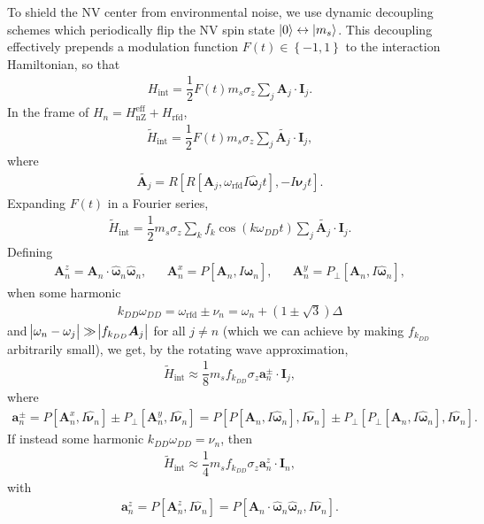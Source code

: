 \documentclass[11pt]{article}
\renewcommand{\t}{\text} %
\newcommand{\f}[2]{\dfrac{#1}{#2}} %
\newcommand{\p}[1]{\left(#1\right)} %
\renewcommand{\sp}[1]{\left[#1\right]} %
\renewcommand{\set}[1]{\left\{#1\right\}} %
\renewcommand{\v}{\bm} %
\newcommand{\uv}[1]{\hat{\v{#1}}} %
\renewcommand{\c}{\cdot} %
\begin{document}
To shield the NV center from environmental noise, we use dynamic
decoupling schemes which periodically flip the NV spin state
$\ket0\leftrightarrow\ket{m_s}$. This decoupling effectively prepends
a modulation function $F\p{t}\in\set{-1,1}$ to the interaction
Hamiltonian, so that
\begin{align}
  H_{\t{int}}=\f12F\p{t}m_s\sigma_z\sum_j\v A_j\c\v I_j.
\end{align}
In the frame of $H_n=H_{\t{nZ}}^{\t{eff}}+H_{\t{rfd}}$,
\begin{align}
  \tilde H_{\t{int}}=\f12F\p{t}m_s\sigma_z\sum_j\tilde{\v A_j}\c\v
  I_j,
\end{align}
where
\begin{align}
  \tilde{\v A_j}=R\sp{R\sp{\v A_j,\omega_{\t{rfd}}I\uv\omega_jt},
    -I\v\nu_jt}.
\end{align}
Expanding $F\p{t}$ in a Fourier series,
\begin{align}
  \tilde H_{\t{int}}=\f12m_s\sigma_z\sum_kf_k\cos\p{k\omega_{DD}t}
  \sum_j\tilde{\v A_j}\c\v I_j.
\end{align}
Defining
\begin{align}
  \v A_n^z=\v A_n\c\uv\omega_n\uv\omega_n, && \v A_n^x=P\sp{\v
    A_n,I\uv\omega_n}, && \v A_n^y=P_\perp\sp{\v A_n,I\uv\omega_n},
\end{align}
when some harmonic
\begin{align}
  k_{DD}\omega_{DD}=\omega_{\t{rfd}}\pm\nu_n
  =\omega_n+\p{1\pm\sqrt3}\Delta
\end{align}
and $\abs{\omega_n-\omega_j}\gg\abs{f_{k_{DD}}\v A_j}$ for all $j\ne
n$ (which we can achieve by making $f_{k_{DD}}$ arbitrarily small), we
get, by the rotating wave approximation, %
\begin{align}
  \tilde H_{\t{int}}\approx\f18m_sf_{k_{DD}}\sigma_z\v a_n^\pm\c\v
  I_j,
\end{align}
where
\begin{align}
  \v a_n^\pm=P\sp{\v A_n^x,I\uv\nu_n}\pm P_\perp\sp{\v
    A_n^y,I\uv\nu_n} =P\sp{P\sp{\v A_n,I\uv\omega_n},I\uv\nu_n}\pm
  P_\perp\sp{P_\perp\sp{\v A_n,I\uv\omega_n},I\uv\nu_n}.
\end{align}
If instead some harmonic $k_{DD}\omega_{DD}=\nu_n$, then
\begin{align}
  \tilde H_{\t{int}}\approx\f14m_sf_{k_{DD}}\sigma_z\v a_n^z\c\v I_n,
\end{align}
with
\begin{align}
  \v a_n^z=P\sp{\v A_n^z,I\uv\nu_n} =P\sp{\v
    A_n\c\uv\omega_n\uv\omega_n,I\uv\nu_n}.
\end{align}
\end{document}
